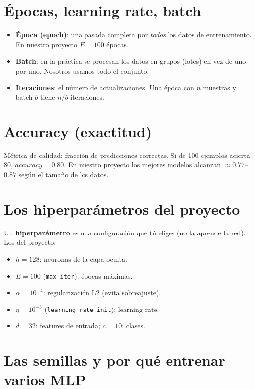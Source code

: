 \documentclass[11pt,a4paper]{article}
\newcommand{\term}[1]{\textbf{\textcolor{clave}{#1}}}
\begin{document}
\section{Épocas, learning rate, batch}

\begin{itemize}
  \item \term{Época (epoch)}: una pasada completa por \emph{todos} los datos de
        entrenamiento. En nuestro proyecto $E=100$ épocas.
  \item \term{Batch}: en la práctica se procesan los datos en grupos (lotes) en
        vez de uno por uno. Nosotros usamos todo el conjunto.
  \item \term{Iteraciones}: el número de actualizaciones. Una época con $n$
        muestras y batch $b$ tiene $n/b$ iteraciones.
\end{itemize}

\section{Accuracy (exactitud)}

Métrica de calidad: fracción de predicciones correctas. Si de 100 ejemplos
acierta 80, $accuracy=0.80$. En nuestro proyecto los mejores modelos alcanzan
$\approx 0.77$--$0.87$ según el tamaño de los datos.

\section{Los hiperparámetros del proyecto}

Un \term{hiperparámetro} es una configuración que tú eliges (no la aprende la
red). Los del proyecto:
\begin{itemize}
  \item $h=128$: neuronas de la capa oculta.
  \item $E=100$ (\texttt{max\_iter}): épocas máximas.
  \item $\alpha=10^{-4}$: regularización L2 (evita sobreajuste).
  \item $\eta=10^{-3}$ (\texttt{learning\_rate\_init}): learning rate.
  \item $d=32$: features de entrada; $c=10$: clases.
\end{itemize}

\section{Las semillas y por qué entrenar varios MLP}
\end{document}
